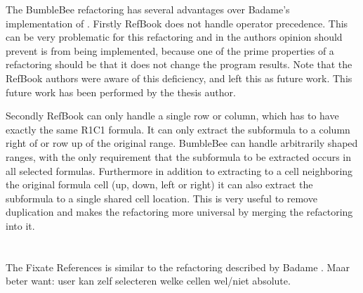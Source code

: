 The BumbleBee  refactoring has several advantages over Badame's implementation of .
Firstly RefBook does not handle operator precedence.
This can be very problematic for this refactoring and in the authors opinion should prevent is from being implemented, because one of the prime properties of a refactoring should be that it does not change the program results.
Note that the RefBook authors were aware of this deficiency, and left this as future work.
This future work has been performed by the thesis author.

Secondly RefBook can only handle a single row or column, which has to have exactly the same R1C1 formula. It can only extract the subformula to a column right of or row up of the original range.
BumbleBee can handle arbitrarily shaped ranges, with the only requirement that the subformula to be extracted occurs in all selected formulas.
Furthermore in addition to extracting to a cell neighboring the original formula cell (up, down, left or right) it can also extract the subformula to a single shared cell location.
This is very useful to remove duplication and makes the refactoring more universal by merging the  refactoring into it.

\section{}

\section{}

\section{}

\section{}


The Fixate References is similar to the  refactoring described by Badame \cite{badame2012refactoring}.
Maar beter want: user kan zelf selecteren welke cellen wel/niet absolute.

